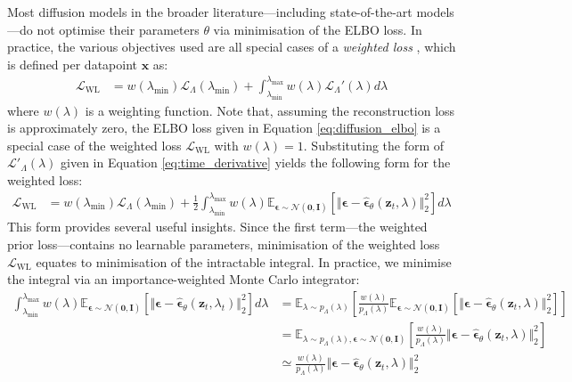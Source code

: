 \documentclass[ oneside,%
                    author={George Herbert},
                    degree={MSci},
                     title={Diffusion Models for Time-Evolving Precipitation Fields},
                  subtitle={}]{dissertation}
\begin{document}
Most diffusion models in the broader literature---including state-of-the-art models---do not optimise their parameters $\theta$ via minimisation of the ELBO loss. In practice, the various objectives used are all special cases of a \textit{weighted loss} \cite{Understanding_Diffusion_Objective_Kingma}, which is defined per datapoint $\mathbf{x}$ as:
\begin{align}
      \mathcal{L}_{\mathrm{WL}}&=w(\lambda_{\min})\mathcal{L}_\Lambda(\lambda_{\min})+\int_{\lambda_{\min}}^{\lambda_{\max}}w(\lambda)\mathcal{L}_\Lambda'(\lambda)d\lambda\label{eq:weighted_loss}
\end{align}
where $w(\lambda)$ is a weighting function. Note that, assuming the reconstruction loss is approximately zero, the ELBO loss given in Equation \ref{eq:diffusion_elbo} is a special case of the weighted loss $\mathcal{L}_{\mathrm{WL}}$ with $w(\lambda) = 1$. Substituting the form of $\mathcal{L}'_\Lambda(\lambda)$ given in Equation \ref{eq:time_derivative} yields the following form for the weighted loss:
\begin{align}
      \mathcal{L}_{\mathrm{WL}}&=w(\lambda_{\min})\mathcal{L}_\Lambda(\lambda_{\min})+\frac{1}{2}\int_{\lambda_{\min}}^{\lambda_{\max}}w(\lambda)\mathbb{E}_{\boldsymbol\epsilon\sim\mathcal{N}(\mathbf{0},\mathbf{I})}\left[\Vert\boldsymbol\epsilon-\hat{\boldsymbol\epsilon}_\theta(\mathbf{z}_t,\lambda)\Vert_2^2\right]d\lambda
\end{align}
This form provides several useful insights. Since the first term---the weighted prior loss---contains no learnable parameters, minimisation of the weighted loss $\mathcal{L}_{\mathrm{WL}}$ equates to minimisation of the intractable integral. In practice, we minimise the integral via an importance-weighted Monte Carlo integrator:
\begin{align}
      \int_{\lambda_{\min}}^{\lambda_{\max}}w(\lambda)\mathbb{E}_{\boldsymbol\epsilon\sim\mathcal{N}(\mathbf{0},\mathbf{I})}\left[\Vert\boldsymbol\epsilon-\hat{\boldsymbol\epsilon}_\theta(\mathbf{z}_t,\lambda_t)\Vert_2^2\right]d\lambda&=\mathbb{E}_{\lambda\sim p_\Lambda(\lambda)}\left[\frac{w(\lambda)}{p_\Lambda(\lambda)}\mathbb{E}_{\boldsymbol\epsilon\sim\mathcal{N}(\mathbf{0},\mathbf{I})}\left[\Vert\boldsymbol\epsilon - \hat{\boldsymbol\epsilon}_\theta(\mathbf{z}_t, \lambda)\Vert_2^2 \right]\right]\\
      &=\mathbb{E}_{\lambda\sim p_\Lambda(\lambda),\boldsymbol\epsilon\sim\mathcal{N}(\mathbf{0}, \mathbf{I})}\left[\frac{w(\lambda)}{p_\Lambda(\lambda)}\Vert \boldsymbol\epsilon-\hat{\boldsymbol\epsilon}_\theta(\mathbf{z}_t,\lambda)\Vert_2^2\right]\\
      &\simeq \frac{w(\lambda)}{p_\Lambda(\lambda)}\Vert \boldsymbol\epsilon-\hat{\boldsymbol\epsilon}_\theta(\mathbf{z}_t,\lambda)\Vert_2^2
\end{align}
\end{document}
